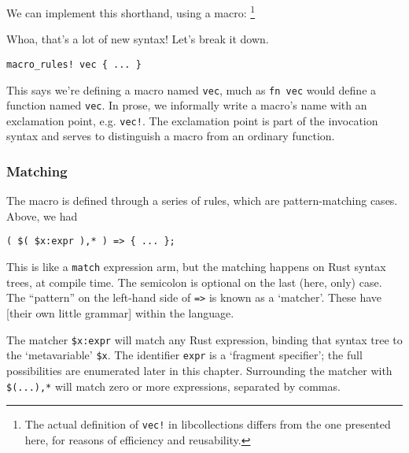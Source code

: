 \documentclass[a4paper,]{book}
\newenvironment{Shaded}{\begin{snugshade}}{\end{snugshade}}
\newcommand{\KeywordTok}[1]{\textcolor[rgb]{0.13,0.29,0.53}{\textbf{{#1}}}}
\newcommand{\OtherTok}[1]{\textcolor[rgb]{0.56,0.35,0.01}{{#1}}}
\newcommand{\NormalTok}[1]{{#1}}
\begin{document}
We can implement this shorthand, using a macro: \footnote{The actual
  definition of \texttt{vec!} in libcollections differs from the one
  presented here, for reasons of efficiency and reusability.}

\begin{Shaded}
\end{Shaded}

Whoa, that's a lot of new syntax! Let's break it down.

\begin{verbatim}
macro_rules! vec { ... }
\end{verbatim}

This says we're defining a macro named \texttt{vec}, much as
\texttt{fn\ vec} would define a function named \texttt{vec}. In prose,
we informally write a macro's name with an exclamation point, e.g.
\texttt{vec!}. The exclamation point is part of the invocation syntax
and serves to distinguish a macro from an ordinary function.

\subsubsection{Matching}\label{matching}

The macro is defined through a series of rules, which are
pattern-matching cases. Above, we had

\begin{verbatim}
( $( $x:expr ),* ) => { ... };
\end{verbatim}

This is like a \texttt{match} expression arm, but the matching happens
on Rust syntax trees, at compile time. The semicolon is optional on the
last (here, only) case. The ``pattern'' on the left-hand side of
\texttt{=\textgreater{}} is known as a `matcher'. These have {[}their
own little grammar{]} within the language.

The matcher \texttt{\$x:expr} will match any Rust expression, binding
that syntax tree to the `metavariable' \texttt{\$x}. The identifier
\texttt{expr} is a `fragment specifier'; the full possibilities are
enumerated later in this chapter. Surrounding the matcher with
\texttt{\$(...),*} will match zero or more expressions, separated by
commas.
\end{document}
